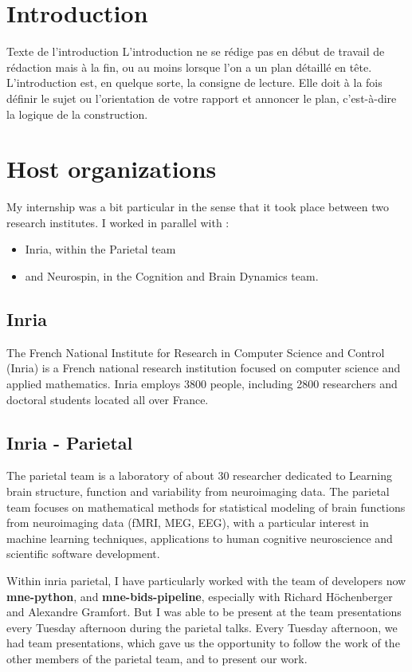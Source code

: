 \chapter*{Introduction}

Texte de l'introduction
L’introduction ne se rédige pas en début de travail de rédaction mais à la fin, ou au moins lorsque l’on a un plan détaillé en tête.
L’introduction est, en quelque sorte, la consigne de lecture. Elle doit à la fois définir le sujet ou l’orientation de votre rapport et annoncer le plan, c’est-à-dire la logique de la construction.


\chapter*{Host organizations}

My internship was a bit particular in the sense that it took place between two research institutes. I worked in parallel with :
\begin{itemize}
    \item Inria, within the Parietal team
    \item and Neurospin, in the Cognition and Brain Dynamics team.
\end{itemize} 

\section*{Inria}

The French National Institute for Research in Computer Science and Control (Inria) is a French national research institution focused on computer science and applied mathematics. Inria employs 3800 people, including 2800 researchers and doctoral students located all over France.

\section*{Inria - Parietal}

The parietal team is a laboratory of about 30 researcher dedicated to Learning brain structure, function and variability from neuroimaging data. The parietal team focuses on mathematical methods for statistical modeling of brain functions from neuroimaging data (fMRI, MEG, EEG), with a particular interest in machine learning techniques, applications to human cognitive neuroscience and scientific software development.

Within inria parietal, I have particularly worked with the team of developers now \textbf{mne-python}, and \textbf{mne-bids-pipeline}, especially with Richard Höchenberger and Alexandre Gramfort. But I was able to be present at the team presentations every Tuesday afternoon during the parietal talks. Every Tuesday afternoon, we had team presentations, which gave us the opportunity to follow the work of the other members of the parietal team, and to present our work.

